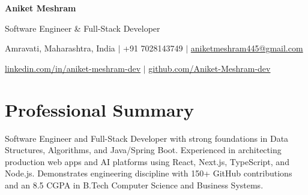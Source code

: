 \documentclass[letterpaper,10pt]{article}
\newcommand{\sep}{\hspace{3pt}$|$\hspace{3pt}}
\begin{document}
\small

\begin{center}
    {\huge \bfseries Aniket Meshram}\par
    \vspace{2.5pt}
    {\normalsize Software Engineer \& Full-Stack Developer}\par
    \vspace{3.5pt}
    \small
    \faMapMarkerAlt\hspace{3pt}Amravati, Maharashtra, India \sep
    \faPhone\hspace{3pt}+91 7028143749 \sep
    \href{mailto:aniketmeshram445@gmail.com}{\faEnvelope\hspace{3pt}aniketmeshram445@gmail.com}\par
    \vspace{2.5pt}
    \href{https://www.linkedin.com/in/aniket-meshram-dev/}{\faLinkedin\hspace{3pt}linkedin.com/in/aniket-meshram-dev} \sep
    \href{https://github.com/Aniket-Meshram-dev}{\faGithub\hspace{3pt}github.com/Aniket-Meshram-dev}
\end{center}
\vspace{2pt}

\section{Professional Summary}
Software Engineer and Full-Stack Developer with strong foundations in Data Structures, Algorithms, and Java/Spring Boot. Experienced in architecting production web apps and AI platforms using React, Next.js, TypeScript, and Node.js. Demonstrates engineering discipline with 150+ GitHub contributions and an 8.5 CGPA in B.Tech Computer Science and Business Systems.

\end{document}
